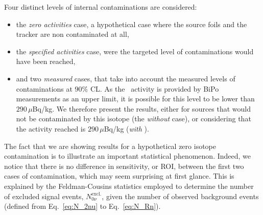 Four distinct levels of internal contaminations are considered:
\begin{itemize}
\item the \emph{zero activities} case, a hypothetical case where the source foils and the tracker are non contaminated at all,
\item the \emph{specified activities} case, were the targeted level of contaminations would have been reached,
\item and two \emph{measured} cases, that take into account the measured levels of contaminations at $90\%$ CL.
  As the \Bi\ activity is provided by BiPo measurements as an upper limit, it is possible for this level to be lower than $290\,\mu$Bq/kg.
  We therefore present the results, either for sources that would not be contaminated by this isotope (the \emph{without \Bi} case), or considering that the activity reached is $290\,\mu$Bq/kg (\emph{with \Bi}).
\end{itemize}
The fact that we are showing results for a hypothetical zero isotope contamination is to illustrate an important statistical phenomenon.
Indeed, we notice that there is no difference in sensitivity, or ROI, between the first two cases of contamination, which may seem surprising at first glance. %
This is explained by the Feldman-Cousins statistics employed to determine the number of excluded signal events, $N_{0\nu}^{\text{excl.}}$, given the number of observed background events (defined from Eq.~\eqref{eq:N_2nu} to Eq.~\eqref{eq:N_Rn}).

